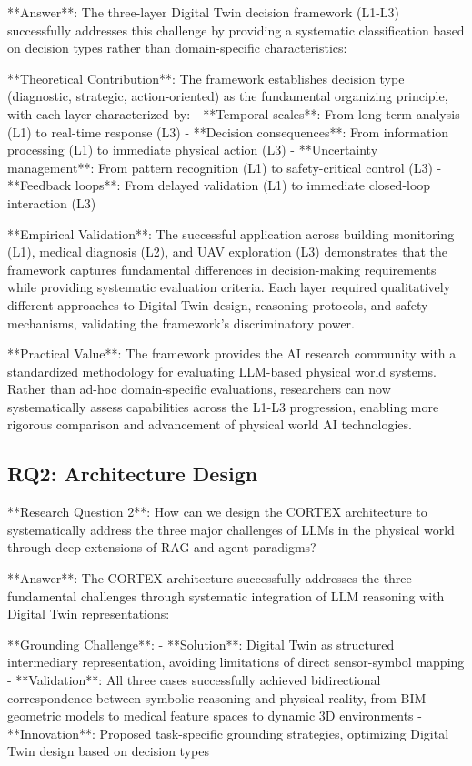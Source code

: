 **Answer**: The three-layer Digital Twin decision framework (L1-L3) successfully addresses this challenge by providing a systematic classification based on decision types rather than domain-specific characteristics:

**Theoretical Contribution**: The framework establishes decision type (diagnostic, strategic, action-oriented) as the fundamental organizing principle, with each layer characterized by:
- **Temporal scales**: From long-term analysis (L1) to real-time response (L3)
- **Decision consequences**: From information processing (L1) to immediate physical action (L3)
- **Uncertainty management**: From pattern recognition (L1) to safety-critical control (L3)
- **Feedback loops**: From delayed validation (L1) to immediate closed-loop interaction (L3)

**Empirical Validation**: The successful application across building monitoring (L1), medical diagnosis (L2), and UAV exploration (L3) demonstrates that the framework captures fundamental differences in decision-making requirements while providing systematic evaluation criteria. Each layer required qualitatively different approaches to Digital Twin design, reasoning protocols, and safety mechanisms, validating the framework's discriminatory power.

**Practical Value**: The framework provides the AI research community with a standardized methodology for evaluating LLM-based physical world systems. Rather than ad-hoc domain-specific evaluations, researchers can now systematically assess capabilities across the L1-L3 progression, enabling more rigorous comparison and advancement of physical world AI technologies.

\subsection{RQ2: Architecture Design}

**Research Question 2**: How can we design the CORTEX architecture to systematically address the three major challenges of LLMs in the physical world through deep extensions of RAG and agent paradigms?

**Answer**: The CORTEX architecture successfully addresses the three fundamental challenges through systematic integration of LLM reasoning with Digital Twin representations:

**Grounding Challenge**: 
- **Solution**: Digital Twin as structured intermediary representation, avoiding limitations of direct sensor-symbol mapping
- **Validation**: All three cases successfully achieved bidirectional correspondence between symbolic reasoning and physical reality, from BIM geometric models to medical feature spaces to dynamic 3D environments
- **Innovation**: Proposed task-specific grounding strategies, optimizing Digital Twin design based on decision types

